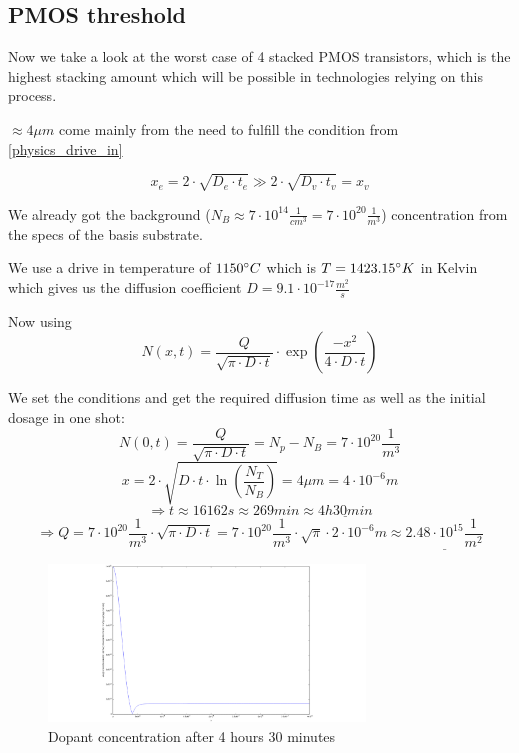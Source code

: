 \subsection{PMOS threshold}\label{pmos_dimensioning}
Now we take a look at the worst case of 4 stacked PMOS transistors, which is the highest stacking amount which will be possible in technologies relying on this process.


$\approx 4 \mu m$ come mainly from the need to fulfill the condition from \autoref{physics_drive_in}

\begin{equation}
x_e = 2 \cdot \sqrt{D_e \cdot t_e} \gg 2 \cdot \sqrt{D_v \cdot t_v} = x_v
\end{equation}

We already got the background ($N_B \approx 7 \cdot 10^{14} \frac{1}{cm^3}=7 \cdot 10^{20} \frac{1}{m^3}$) concentration from the specs of the basis substrate.

We use a drive in temperature of $1150 \degree C$ which is  $T = 1423.15 \degree K$ in Kelvin which gives us the diffusion coefficient $D=9.1 \cdot 10^{-17}  \frac{m^2}{s}$

Now using
\begin{equation}
N(x,t)
=
\frac{Q}{\sqrt{\pi\cdot D \cdot t}} \cdot \exp\left(\frac{-x^2}{4 \cdot D \cdot t}\right)
\end{equation}

We set the conditions and get the required diffusion time as well as the initial dosage in one shot:
\begin{equation}
N(0,t)
=
\frac{Q}{\sqrt{\pi\cdot D \cdot t}}
=
N_p-N_B
=
7 \cdot 10^{20} \frac{1}{m^3}
\end{equation}
\begin{equation}
x
=
2 \cdot \sqrt{D \cdot t \cdot\ln\left(\frac{N_T}{N_B}\right)}
=
4 \mu m
=
4 \cdot 10^{-6} m
\end{equation}
\begin{equation}
\Rightarrow
t
\approx
16162s
\approx
269min
\approx
\underline{4h 30 min}
\end{equation}
\begin{equation}
\Rightarrow
Q
=
7 \cdot 10^{20} \frac{1}{m^3} \cdot \sqrt{\pi\cdot D \cdot t}
=
7 \cdot 10^{20} \frac{1}{m^3} \cdot \sqrt{\pi} \cdot 2 \cdot 10^{-6} m
\approx
\underline{2.48 \cdot 10^{15} \frac{1}{m^2}}
\end{equation}

\begin{figure}[H]
	\centering
	\includegraphics[width=0.75\textwidth]{n-well-diffusion.png}
	\caption{Dopant concentration after 4 hours 30 minutes}
	\label{nwell_drive_in_outcome}
\end{figure}